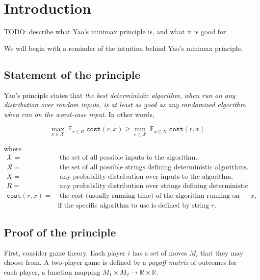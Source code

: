 \section{Introduction}

\newcommand{\Expected}{\mathop{\mathds{E}}}

TODO: describe what Yao's minimax principle is, and what it is good for

We will begin with a reminder of the intuition behind Yao's minimax principle.

\subsection{Statement of the principle}

Yao's principle states that \emph{the best deterministic algorithm, when run on any distribution over random inputs, is at least as good as any randomized algorithm when run on the worst-case input}. In other words,

$$\max_{x \in \mathcal{X}} \Expected_{r \in R} \texttt{cost}(r, x) \geq \min_{r \in \mathcal{R}} \Expected_{x \in X} \texttt{cost}(r, x)$$

where \begin{align*}
\mathcal{X} =&\; \text{the set of all possible inputs to the algorithm.}
\\
\mathcal{R} =&\; \text{the set of all possible strings defining deterministic algorithms.}
\\
X =&\; \text{any probability distribution over inputs to the algorithm.}
\\
R =&\; \text{any probability distribution over strings defining deterministic algorithms.}
\\
\texttt{cost}(r, x) =&\; \text{the cost (usually running time) of the algorithm running on input $x$,}
          \\& \text{if the specific algorithm to use is defined by string $r$.}
\end{align*}

\subsection{Proof of the principle}

First, consider game theory. Each player $i$ has a set of moves $M_i$ that they may choose from. A two-player game is defined by a \emph{payoff matrix} of outcomes for each player, a function mapping $M_1 \times M_2 \rightarrow \mathds{R} \times \mathds{R}$.

